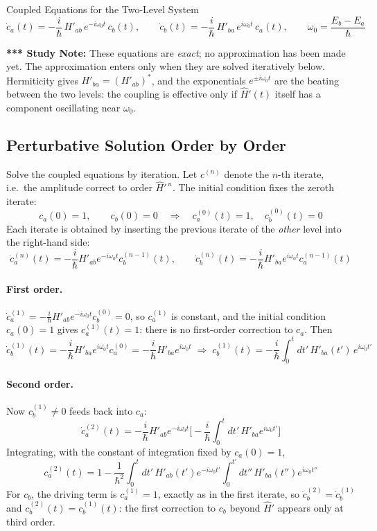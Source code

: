 \documentclass[11pt,a4paper]{article}
\begin{document}
\begin{thm}{Coupled Equations for the Two-Level System}
\[
\dot c_a(t) = -\frac{i}{\hbar}\,H'_{ab}\,e^{-i\omega_0t}\,c_b(t), \qquad
\dot c_b(t) = -\frac{i}{\hbar}\,H'_{ba}\,e^{i\omega_0t}\,c_a(t), \qquad \omega_0 = \frac{E_b-E_a}{\hbar}
\]
\end{thm}

\textbf{*** Study Note:} These equations are \textit{exact}; no approximation has been made yet. The approximation enters only when they are solved iteratively below. Hermiticity gives $H'_{ba}=(H'_{ab})^*$, and the exponentials $e^{\pm i\omega_0t}$ are the beating between the two levels: the coupling is effective only if $\hat H'(t)$ itself has a component oscillating near $\omega_0$.

\subsection{Perturbative Solution Order by Order}
Solve the coupled equations by iteration. Let $c^{(n)}$ denote the $n$-th iterate, i.e.\ the amplitude correct to order $\hat H'^{\,n}$. The initial condition fixes the zeroth iterate:
\[
c_a(0)=1,\qquad c_b(0)=0 \quad\Longrightarrow\quad c_a^{(0)}(t)=1,\quad c_b^{(0)}(t)=0
\]
Each iterate is obtained by inserting the previous iterate of the \textit{other} level into the right-hand side:
\[
\dot c_a^{(n)}(t) = -\frac{i}{\hbar}H'_{ab}e^{-i\omega_0t}c_b^{(n-1)}(t), \qquad
\dot c_b^{(n)}(t) = -\frac{i}{\hbar}H'_{ba}e^{i\omega_0t}c_a^{(n-1)}(t)
\]

\paragraph{First order.} $\dot c_a^{(1)} = -\frac i\hbar H'_{ab}e^{-i\omega_0t}c_b^{(0)}=0$, so $c_a^{(1)}$ is constant, and the initial condition $c_a(0)=1$ gives $c_a^{(1)}(t)=1$: there is no first-order correction to $c_a$. Then
\[
\dot c_b^{(1)}(t) = -\frac i\hbar H'_{ba}e^{i\omega_0t}c_a^{(0)} = -\frac i\hbar H'_{ba}e^{i\omega_0t}
\;\Longrightarrow\;
c_b^{(1)}(t) = -\frac i\hbar\int_0^t dt'\,H'_{ba}(t')\,e^{i\omega_0t'}
\]

\paragraph{Second order.} Now $c_b^{(1)}\neq0$ feeds back into $c_a$:
\[
\dot c_a^{(2)}(t) = -\frac i\hbar H'_{ab}e^{-i\omega_0t}\Big[-\frac i\hbar\int_0^tdt'\,H'_{ba}e^{i\omega_0t'}\Big]
\]
Integrating, with the constant of integration fixed by $c_a(0)=1$,
\[
c_a^{(2)}(t) = 1 - \frac1{\hbar^2}\int_0^tdt'\,H'_{ab}(t')e^{-i\omega_0t'}\int_0^{t'}dt''\,H'_{ba}(t'')e^{i\omega_0t''}
\]
For $c_b$, the driving term is $c_a^{(1)}=1$, exactly as in the first iterate, so $\dot c_b^{(2)}=\dot c_b^{(1)}$ and $c_b^{(2)}(t)=c_b^{(1)}(t)$: the first correction to $c_b$ beyond $\hat H'$ appears only at third order.
\end{document}
